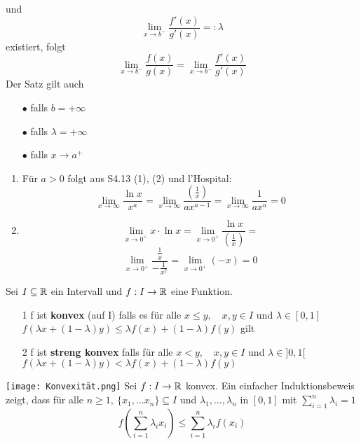 und
\[ \lim\limits_{x \rightarrow b^-} \frac{f'(x)}{g'(x)} =: \lambda\]
existiert, folgt
\[ \lim\limits_{x \rightarrow b^-} \frac{f(x)}{g(x)} = \lim\limits_{x \rightarrow b^-} \frac{f'(x)}{g'(x)}\]
 Der Satz gilt auch 
\begin{enumerate}
    \item [$\bullet$] falls \(b = + \infty\)
    \item [$\bullet$] falls \( \lambda = + \infty\)
    \item [$\bullet$] falls \( x \rightarrow a^{+}\)
\end{enumerate}
\Bsp[4.25]
\begin{enumerate}
    \item Für \( a > 0\) folgt aus S4.13 (1), (2) und l'Hospital:
    \[ \lim_{x \rightarrow \infty} \frac{\ln x }{x^a} = \lim_{x \rightarrow \infty} \frac{\left( \frac{1}{x}\right)}{ax^{a-1}} = \lim_{x \rightarrow \infty} \frac{1}{ax^a} = 0\]
    \item \[ \lim_{x \rightarrow 0^+} x \cdot \ln x = \lim_{x \rightarrow 0^+} \frac{\ln x }{\left( \frac{1}{x}\right)} = \] 
    \[\lim_{x \rightarrow 0^+} \frac{\frac{1}{x}}{-\frac{1}{x^2}} = \lim_{x \rightarrow 0^+} (-x) = 0\]
\end{enumerate}
\Def[4.26] Sei \(I \subseteq \mathbb{R} \) ein Intervall und \(f: I \rightarrow \mathbb{R} \) eine Funktion.
\begin{enumerate}
    \item [1] f ist \textbf{konvex} (auf I) falls es für alle \newline \(x \leq y, \quad x,y \in I \) und \(\lambda \in [0,1]\) \newline
    \(f(\lambda x + (1 - \lambda)y) \leq \lambda f(x) + (1 - \lambda) f(y)\) gilt
    \item [2] f ist \textbf{streng konvex} falls für alle \newline \(x < y, \quad x,y \in I \) und \( \lambda \in ]0,1[\) \newline
    \(f(\lambda x + (1 - \lambda)y) < \lambda f(x) + (1 - \lambda)f(y)\)
\end{enumerate}
\texttt{[image: Konvexität.png]} \newline
{} Sei \(f : I \rightarrow \mathbb{R} \) konvex. Ein einfacher Induktionsbeweis zeigt, dass für alle \newline \(n \geq 1, \ \{x_1, \dots x_n \} \subseteq I \) und \(\lambda_1, \dots, \lambda_n\) in \([0,1]\) mit \(\sum_{i=1}^n \lambda_i = 1\)
\[f\left(\sum_{i=1}^n \lambda_i x_i\right) \leq \sum_{i=1}^n \lambda_i f(x_i)\]
